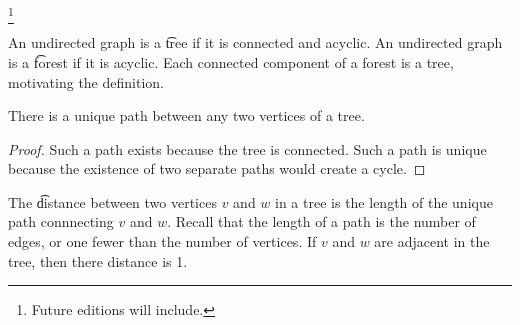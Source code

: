 
\footnote{Future editions will include.}


An undirected graph is a \t{tree} if it is connected and acyclic.
An undirected graph is a \t{forest} if it is acyclic.
Each connected component of a forest is a tree, motivating the definition.



%

%
%

\begin{proposition}
There is a unique path between any two vertices of a tree.
\begin{proof}
  Such a path exists because the tree is connected.
  Such a path is unique because the existence of two separate paths would create a cycle.
\end{proof}
\end{proposition}


The \t{distance} between two vertices $v$ and $w$ in a tree is the length of the unique path connnecting $v$ and $w$.
Recall that the length of a path is the number of edges, or one fewer than the number of vertices.
If $v$ and $w$ are adjacent in the tree, then there distance is 1.

\blankpage
